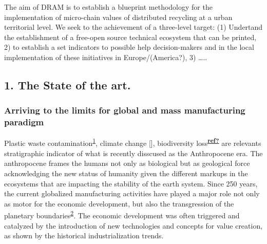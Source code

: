 \documentclass[
  11pt,
  a4paperpaper,
  onecolumn]{article}
\begin{document}
\begin{tcolorbox}[enhanced jigsaw, arc=.35mm, breakable, leftrule=.75mm, opacityback=0, toprule=.15mm, colframe=quarto-callout-note-color-frame, titlerule=0mm, colbacktitle=quarto-callout-note-color!10!white, colback=white, bottomtitle=1mm, left=2mm, toptitle=1mm, opacitybacktitle=0.6, title=\textcolor{quarto-callout-note-color}{\faInfo}\hspace{0.5em}{DRAM in a nutshell}, rightrule=.15mm, bottomrule=.15mm, coltitle=black]
The aim of DRAM is to establish a blueprint methodology for the
implementation of micro-chain values of distributed recycling at a urban
territorial level. We seek to the achievement of a three-level target:
(1) Undertand the establishment of a free-open source technical
ecosystem that can be printed, 2) to establish a set indicators to
possible help decision-makers and in the local implementation of these
initiatives in Europe/(America?), 3) \ldots..
\end{tcolorbox}

\hypertarget{the-state-of-the-art.}{%
\subsection{1. The State of the art.}\label{the-state-of-the-art.}}

\linenumbers

\hypertarget{arriving-to-the-limits-for-global-and-mass-manufacturing-paradigm}{%
\subsubsection{Arriving to the limits for global and mass manufacturing
paradigm}\label{arriving-to-the-limits-for-global-and-mass-manufacturing-paradigm}}

Plastic waste
contamination\textsuperscript{\protect\hyperlink{ref-de-la-torre2021}{1}},
climate change {[}{]}, biodiversity
loss\textsuperscript{\protect\hyperlink{ref-ref}{\textbf{ref?}}} are
relevants stratigraphic indicator of what is recently disscused as the
Anthropocene era. The anthropocene frames the humans not only as
biological but as geological force acknowledging the new status of
humanity given the different markups in the ecosystems that are
impacting the stability of the earth system. Since 250 years, the
current globalized manufacturing activities have played a major role not
only as motor for the economic development, but also the transgression
of the planetary
boundaries\textsuperscript{\protect\hyperlink{ref-ONeill2018}{2}}. The
economic development was often triggered and catalyzed by the
introduction of new technologies and concepts for value creation, as
shown by the historical industrialization trends.
\end{document}
